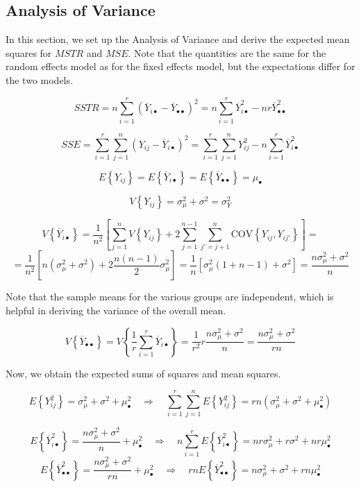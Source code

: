 \documentclass[
]{book}
\begin{document}
\subsection{Analysis of Variance}\label{analysis-of-variance}

In this section, we set up the Analysis of Variance and derive the
expected mean squares for \(MSTR\) and \(MSE\). Note that the quantities
are the same for the random effects model as for the fixed effects
model, but the expectations differ for the two models.

\[
SSTR = n\sum_{i=1}^r\left(\overline{Y}_{i\bullet}-\overline{Y}_{\bullet\bullet}\right)^2 =
n\sum_{i=1}^r\overline{Y}_{i\bullet}^2-nr\overline{Y}_{\bullet\bullet}^2
\]

\[
SSE=\sum_{i=1}^r\sum_{j=1}^n\left(Y_{ij}-\overline{Y}_{i\bullet}\right)^2 =
\sum_{i=1}^r\sum_{j=1}^n Y_{ij}^2 - n\sum_{i=1}^r\overline{Y}_{i\bullet}^2
\]

\[
E\left\{Y_{ij}\right\} = E\left\{\overline{Y}_{i\bullet}\right\} =
E\left\{\overline{Y}_{\bullet\bullet}\right\} = \mu_{\bullet}
\]

\[
V\left\{Y_{ij}\right\}=\sigma_{\mu}^2+\sigma^2=\sigma_Y^2
\]

\[
V\left\{\overline{Y}_{i\bullet}\right\}
=\frac{1}{n^2}\left[\sum_{j=1}^nV\left\{Y_{ij}\right\} + 
2\sum_{j=1}^{n-1}\sum_{j'=j
+1}^n\mbox{COV}\left\{Y_{ij},Y_{ij'}\right\}\right] =
\] \[
=\frac{1}{n^2}\left[n\left(\sigma_{\mu}^2+\sigma^2\right) +
2\frac{n(n-1)}{2}\sigma_{\mu}^2\right]=
\frac{1}{n}\left[\sigma_{\mu}^2(1+n-1) + \sigma^2\right]=
\frac{n\sigma_{\mu}^2+\sigma^2}{n}
\]

Note that the sample means for the various groups are independent, which
is helpful in deriving the variance of the overall mean.

\[
V\left\{\overline{Y}_{\bullet\bullet}\right\} = 
V\left\{\frac{1}{r}\sum_{i=1}^r\overline{Y}_{i\bullet}\right\}
=\frac{1}{r^2}r\frac{n\sigma_{\mu}^2+\sigma^2}{n}=
\frac{n\sigma_{\mu}^2+\sigma^2}{rn}
\]

Now, we obtain the expected sums of squares and mean squares.

\[
E\left\{Y_{ij}^2\right\} = \sigma_{\mu}^2+\sigma^2 + \mu_{\bullet}^2 
\quad \Rightarrow \quad
\sum_{i=1}^r\sum_{j=1}^n E\left\{Y_{ij}^2\right\} =
rn\left(\sigma_{\mu}^2+\sigma^2 + \mu_{\bullet}^2\right)
\]

\[
E\left\{\overline{Y}_{i\bullet}^2\right\} =\frac{n\sigma_{\mu}^2+\sigma^2}{n}+\mu_{\bullet}^2
\quad \Rightarrow \quad
n\sum_{i=1}^rE\left\{\overline{Y}_{i\bullet}^2\right\}
=nr\sigma_{\mu}^2 + r\sigma^2 + nr\mu_{\bullet}^2
\] \[
E\left\{\overline{Y}_{\bullet\bullet}^2\right\} =
\frac{n\sigma_{\mu}^2+\sigma^2}{rn} + \mu_{\bullet}^2
\quad \Rightarrow \quad
rnE\left\{\overline{Y}_{\bullet\bullet}^2\right\} = n\sigma_{\mu}^2+\sigma^2 +
rn\mu_{\bullet}^2
\]
\end{document}
